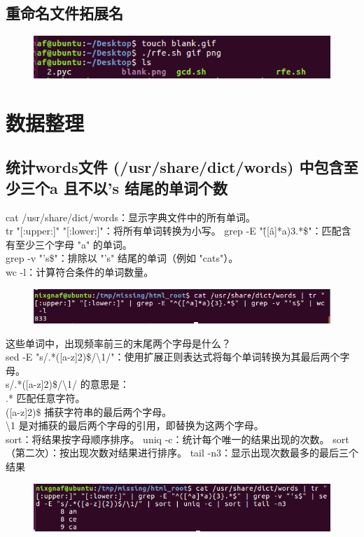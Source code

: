 \documentclass{article}
\begin{document}
\subsection{重命名文件拓展名}

\begin{figure}[h]
    \centering
    \includegraphics[width=0.5\linewidth]{image5.png}
\end{figure}

\section{数据整理}
\subsection{统计words文件 (/usr/share/dict/words) 中包含至少三个a 且不以's 结尾的单词个数}
\noindent cat /usr/share/dict/words：显示字典文件中的所有单词。\\
tr "[:upper:]" "[:lower:]"：将所有单词转换为小写。
grep -E "\^([\^a]*a){3}.*\$"：匹配含有至少三个字母 "a" 的单词。\\
grep -v "'s\$"：排除以 "'s" 结尾的单词（例如 "cats"）。\\
wc -l：计算符合条件的单词数量。\\
\begin{figure}[h]
    \centering
    \includegraphics[width=0.5\linewidth]{image25.png}
\end{figure}

这些单词中，出现频率前三的末尾两个字母是什么？ \\
sed -E "s/.*([a-z]{2})\$/\textbackslash1/"：使用扩展正则表达式将每个单词转换为其最后两个字母。\\
s/.*([a-z]{2})\$/\textbackslash1/ 的意思是：\\
.* 匹配任意字符。\\
([a-z]{2})\$ 捕获字符串的最后两个字母。\\
\textbackslash1 是对捕获的最后两个字母的引用，即替换为这两个字母。\\
sort：将结果按字母顺序排序。
uniq -c：统计每个唯一的结果出现的次数。
sort（第二次）：按出现次数对结果进行排序。
tail -n3：显示出现次数最多的最后三个结果
\begin{figure}[h]
    \centering
    \includegraphics[width=0.5\linewidth]{image26.png}
\end{figure}
\end{document}
